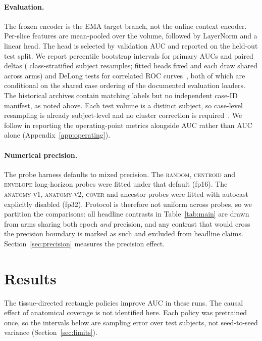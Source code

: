 \documentclass{article}
\newcommand{\ArmBest}{\textsc{centroid}}
\begin{document}
\paragraph{Evaluation.} The frozen encoder is the EMA target branch, not the
online context encoder. Per-slice features are
mean-pooled over the volume, followed by LayerNorm and a linear head. The head is
selected by validation AUC and reported on the held-out test split. We report
percentile bootstrap intervals for primary AUCs and paired deltas (\Nboot{}
class-stratified subject resamples; fitted heads fixed and each draw shared across arms) and
DeLong tests for correlated ROC curves~\citep{delong1988roc}, both of which are
conditional on the shared case ordering of the documented evaluation loaders.
The historical archives contain matching labels but no independent case-ID
manifest, as noted above.
Each test volume is a distinct subject, so case-level resampling is already
subject-level and no cluster correction is
required~\citep{obuchowski1997clusteredroc,rutter2000clusterbootstrap}. We follow
\citet{maierhein2024metricsreloaded} in reporting the operating-point metrics
alongside AUC rather than AUC alone (Appendix~\ref{app:operating}).

\paragraph{Numerical precision.} The probe harness
defaults to mixed precision. The \textsc{random}, \ArmBest{} and
\textsc{envelope} long-horizon probes were fitted under that default (fp16).
The \textsc{anatomy-v1}, \textsc{anatomy-v2}, \textsc{cover} and ancestor probes
were fitted with autocast explicitly disabled (fp32). Protocol is therefore not
uniform across probes, so we partition the comparisons: all headline contrasts in
Table~\ref{tab:main} are drawn from arms sharing both epoch \emph{and}
precision, and any contrast that would cross the precision boundary is marked
as such and excluded from headline claims. Section~\ref{sec:precision} measures
the precision effect.

\section{Results}
\label{sec:results}

The tissue-directed rectangle policies improve AUC in these runs. The causal
effect of anatomical coverage is not identified here. Each policy was pretrained once, so the
intervals below are sampling error over test subjects, not seed-to-seed
variance (Section~\ref{sec:limits}).
\end{document}
